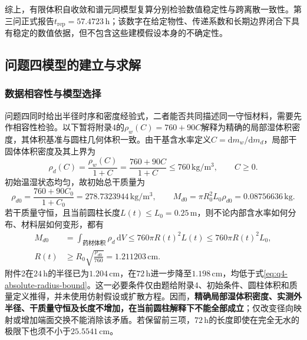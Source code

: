 \documentclass[withoutpreface,bwprint]{cumcmthesis}
\begin{document}
综上，有限体积自收敛和谱元同模型复算分别检验数值稳定性与跨离散一致性。第三问正式报告$t_{\mathrm{rep}}=57.4723\,\mathrm h$；该数字在给定物性、传递系数和长期边界闭合下具有稳定的数值依据，但不包含这些建模假设本身的不确定性。


\subsection{问题四模型的建立与求解}

\subsubsection{数据相容性与模型选择}
\label{sec:q4-compatibility}

问题四同时给出半径时序和密度经验式，二者能否共同描述同一守恒材料，需要先作相容性检验。以下暂将附录4的$\rho_w(C)=760+90C$解释为精确的局部湿体积密度，其体积基准与圆柱几何体积一致。由干基含水率定义$C=\mathrm dm_w/\mathrm dm_d$，局部干固体体积密度及其上界为
\begin{equation}
\rho_d(C)=\frac{\rho_w(C)}{1+C}
=\frac{760+90C}{1+C}\le760\,\mathrm{kg/m^3},
\qquad C\ge0.
\label{eq:q4-true-dry-density-bound}
\end{equation}
初始温湿状态均匀，故初始总干质量为
\begin{equation}
\rho_{d0}=\frac{760+90C_0}{1+C_0}=278.7323944\,\mathrm{kg/m^3},
\qquad
M_{d0}=\pi R_0^2L_0\rho_{d0}=0.08756636\,\mathrm{kg}.
\label{eq:q4-initial-dry-mass}
\end{equation}
若干质量守恒，且当前圆柱长度$L(t)\le L_0=0.25\,\mathrm m$，则不论内部含水率如何分布、材料层如何变形，都有
\begin{equation}
\begin{aligned}
M_{d0}&=\int_{\text{药材体积}}\rho_d\,\mathrm dV
\le760\pi R(t)^2L(t)\le760\pi R(t)^2L_0,\\
R(t)&\ge R_0\sqrt{\frac{\rho_{d0}}{760}}
=1.211203\,\mathrm{cm}.
\end{aligned}
\label{eq:q4-absolute-radius-bound}
\end{equation}
附件2在$24\,\mathrm h$的半径已为$1.204\,\mathrm{cm}$，在$72\,\mathrm h$进一步降至$1.198\,\mathrm{cm}$，均低于式\eqref{eq:q4-absolute-radius-bound}。这一必要条件仅由题给附录4、初始条件、圆柱体积和质量定义推得，并未使用仿射假设或扩散方程。因而，\textbf{精确局部湿体积密度、实测外半径、干质量守恒及长度不增加，在当前圆柱解释下不能全部成立}；仅改变径向映射或增加端面交换不能消除该矛盾。若保留前三项，$72\,\mathrm h$的长度即使在完全无水的极限下也须不小于$25.5541\,\mathrm{cm}$。
\end{document}
